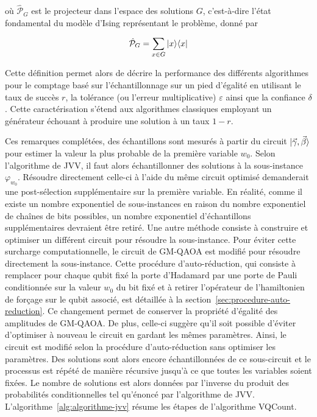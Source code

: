 où $\hat{\mathcal{P}}_{G}$ est le projecteur dans l'espace des solutions $G$, c'est-à-dire l'état fondamental du modèle d'Ising représentant le problème, donné par

\begin{equation}
    \hat{\mathcal{P}}_{G} = \sum_{x \in G} \ket{x}\!\bra{x}
\end{equation}

Cette définition permet alors de décrire la performance des différents algorithmes pour le comptage basé sur l'échantillonnage sur un pied d'égalité en utilisant le taux de succès $r$, la tolérance (ou l'erreur multiplicative) $\varepsilon$ ainsi que la confiance $\delta$. Cette caractérisation s'étend aux algorithmes classiques employant un générateur échouant à produire une solution à un taux $1 - r$.

Ces remarques complétées, des échantillons sont mesurés à partir du circuit $\ket{\vec{\gamma}, \vec{\beta}}$ pour estimer la valeur la plus probable de la première variable $w_{0}$. Selon l'algorithme de JVV, il faut alors échantillonner des solutions à la sous-instance $\varphi_{w_{0}}$. Résoudre directement celle-ci à l'aide du même circuit optimisé demanderait une post-sélection supplémentaire sur la première variable. En réalité, comme il existe un nombre exponentiel de sous-instances en raison du nombre exponentiel de chaînes de bits possibles, un nombre exponentiel d'échantillons supplémentaires devraient être retiré. Une autre méthode consiste à construire et optimiser un différent circuit pour résoudre la sous-instance. Pour éviter cette surcharge computationnelle, le circuit de GM-QAOA est modifié pour résoudre directement la sous-instance. Cette procédure d'auto-réduction, qui consiste à remplacer pour chaque qubit fixé la porte d'Hadamard par une porte de Pauli conditionnée sur la valeur $w_{0}$ du bit fixé et à retirer l'opérateur de l'hamiltonien de forçage sur le qubit associé, est détaillée à la section~\ref{sec:procedure-auto-reduction}.
Ce changement permet de conserver la propriété d'égalité des amplitudes de GM-QAOA. De plus, celle-ci suggère qu'il soit possible d'éviter d'optimiser à nouveau le circuit en gardant les mêmes paramètres. Ainsi, le circuit est modifié selon la procédure d'auto-réduction sans optimiser les paramètres. Des solutions sont alors encore échantillonnées de ce sous-circuit et le processus est répété de manière récursive jusqu'à ce que toutes les variables soient fixées. Le nombre de solutions est alors données par l'inverse du produit des probabilités conditionnelles tel qu'énoncé par l'algorithme de JVV. L'algorithme~\ref{alg:algorithme-jvv} résume les étapes de l'algorithme VQCount.

